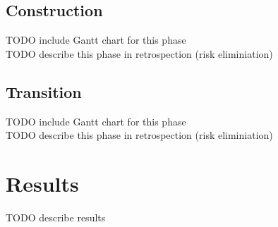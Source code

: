 \section{Construction}
TODO include Gantt chart for this phase\\
TODO describe this phase in retrospection (risk eliminiation)\\

\section{Transition}
TODO include Gantt chart for this phase\\
TODO describe this phase in retrospection (risk eliminiation)\\

\chapter{Results}
TODO describe results\\
